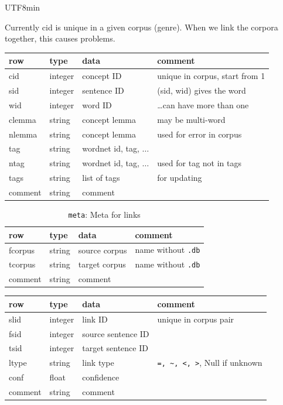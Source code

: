 \documentclass[25pt,landscape,headrule,footrule,dvips]{foils}
\newcommand{\emp}[1]{\textcolor{red}{#1}}
\newcommand{\myslide}[1]{\foilhead[-25mm]{\raisebox{12mm}[0mm]{\emp{#1}}}}
\begin{document}
\begin{CJK}{UTF8}{min}
\myslide{Monolingual Concept Information}

Currently cid is unique in a given corpus (genre).  When we link the
corpora together, this causes problems.

\noindent  \begin{tabular}{llll}
  \textbf{row}   &  \textbf{type} & \textbf{data} & \textbf{comment} \\\hline
  cid   & integer & concept ID  & unique in corpus, start from 1 \\ 
  sid   & integer & sentence ID & (sid, wid) gives the word \\
  wid   & integer & word ID & \ldots can have more than one\\
  clemma & string  & concept lemma & may be multi-word \\
  nlemma & string  & concept lemma & used for error in corpus \\
  tag   & string & wordnet id, tag, $\ldots$ \\
  ntag   & string & wordnet id, tag, $\ldots$ & used for tag not in tags\\
  tags & string & list of tags & for updating \\
  comment & string & comment \\
\hline
\end{tabular}


\myslide{Cross-Lingual Meta}
\begin{table}[htbp]
\centering
  \begin{tabular}{llll}
  \textbf{row}   &  \textbf{type} & \textbf{data} & \textbf{comment} \\
  \hline
  fcorpus & string & source corpus & name without \texttt{.db}\\
  tcorpus & string & target corpus & name without \texttt{.db}\\
  comment & string & comment \\
\hline
\end{tabular}
\caption{\texttt{meta}: Meta for links}
\end{table}

\myslide{SLINK Cross-Lingual Sentence Links}

\noindent  \begin{tabular}{llll}
  \textbf{row}   &  \textbf{type} & \textbf{data} & \textbf{comment} \\\hline
  slid & integer & link ID & unique in corpus pair \\
  fsid   & integer & source sentence ID & \\
  tsid   & integer & target sentence ID & \\
  ltype  & string  & link type &  \verb|=, ~, <, >|, Null if unknown\\
  conf   & float & confidence \\
  comment & string & comment \\
\hline
\end{tabular}



\end{CJK}
\end{document}
